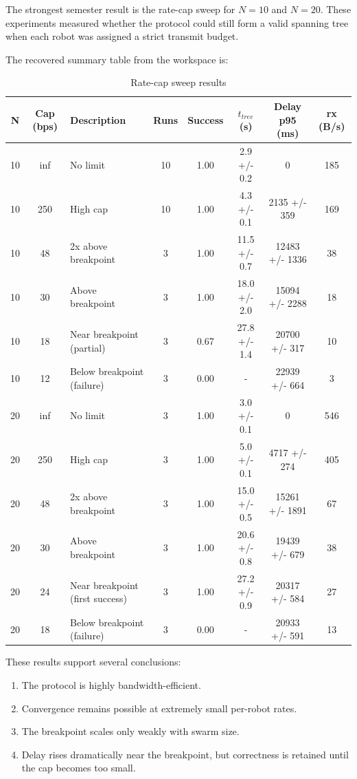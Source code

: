 \documentclass[11pt,a4paper]{article}
\begin{document}
The strongest semester result is the rate-cap sweep for \(N = 10\) and \(N = 20\). These experiments measured whether the protocol could still form a valid spanning tree when each robot was assigned a strict transmit budget.

The recovered summary table from the workspace is:

\begin{table}[htbp]
  \centering
  \caption{Rate-cap sweep results}
  \label{tab:rate_cap}
  \begin{tabular}{|c|c|l|c|c|c|c|c|}
    \hline
    N & Cap (bps) & Description & Runs & Success & \(t_{tree}\) (s) & Delay p95 (ms) & rx (B/s) \\
    \hline
    10 & inf & No limit & 10 & 1.00 & 2.9 +/- 0.2 & 0 & 185 \\
    10 & 250 & High cap & 10 & 1.00 & 4.3 +/- 0.1 & 2135 +/- 359 & 169 \\
    10 & 48 & 2x above breakpoint & 3 & 1.00 & 11.5 +/- 0.7 & 12483 +/- 1336 & 38 \\
    10 & 30 & Above breakpoint & 3 & 1.00 & 18.0 +/- 2.0 & 15094 +/- 2288 & 18 \\
    10 & 18 & Near breakpoint (partial) & 3 & 0.67 & 27.8 +/- 1.4 & 20700 +/- 317 & 10 \\
    10 & 12 & Below breakpoint (failure) & 3 & 0.00 & - & 22939 +/- 664 & 3 \\
    \hline
    20 & inf & No limit & 3 & 1.00 & 3.0 +/- 0.1 & 0 & 546 \\
    20 & 250 & High cap & 3 & 1.00 & 5.0 +/- 0.1 & 4717 +/- 274 & 405 \\
    20 & 48 & 2x above breakpoint & 3 & 1.00 & 15.0 +/- 0.5 & 15261 +/- 1891 & 67 \\
    20 & 30 & Above breakpoint & 3 & 1.00 & 20.6 +/- 0.8 & 19439 +/- 679 & 38 \\
    20 & 24 & Near breakpoint (first success) & 3 & 1.00 & 27.2 +/- 0.9 & 20317 +/- 584 & 27 \\
    20 & 18 & Below breakpoint (failure) & 3 & 0.00 & - & 20933 +/- 591 & 13 \\
    \hline
  \end{tabular}
\end{table}

These results support several conclusions:
\begin{enumerate}
  \item The protocol is highly bandwidth-efficient.
  \item Convergence remains possible at extremely small per-robot rates.
  \item The breakpoint scales only weakly with swarm size.
  \item Delay rises dramatically near the breakpoint, but correctness is retained until the cap becomes too small.
\end{enumerate}
\end{document}
